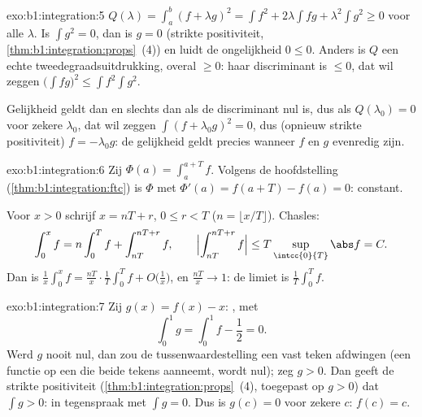 \begin{solution}{exo:b1:integration:5}
$Q(\lambda) = \int_a^b (f + \lambda g)^2 = \int f^2 + 2\lambda \int
fg + \lambda^2 \int g^2 \geq 0$ voor alle $\lambda$. Is $\int g^2 =
0$, dan is $g = 0$ (strikte positiviteit,
\cref{thm:b1:integration:props}~(4)) en luidt de ongelijkheid $0
\leq 0$. Anders is $Q$ een echte tweedegraadsuitdrukking, overal
$\geq 0$: haar discriminant is $\leq 0$, dat wil zeggen $\bigl(\int
fg\bigr)^2 \leq \int f^2 \int g^2$.

Gelijkheid geldt dan en slechts dan als de discriminant nul is, dus
als $Q(\lambda_0) = 0$ voor zekere $\lambda_0$, dat wil zeggen
$\int (f + \lambda_0 g)^2 = 0$, dus (opnieuw strikte positiviteit)
$f = -\lambda_0 g$: de gelijkheid geldt precies wanneer $f$ en $g$
evenredig zijn.
\end{solution}

\begin{solution}{exo:b1:integration:6}
Zij $\Phi(a) = \int_a^{a+T} f$. Volgens de hoofdstelling
(\cref{thm:b1:integration:ftc}) is $\Phi$  met $\Phi'(a) =
f(a + T) - f(a) = 0$: constant.

Voor $x > 0$ schrijf $x = nT + r$, $0 \leq r < T$ ($n = \lfloor x/T
\rfloor$). Chasles:
\[
\int_0^x f = n \int_0^T f + \int_{nT}^{nT + r} f,
\qquad
\Bigl| \int_{nT}^{nT+r} f \Bigr| \leq T \sup_{\intcc{0}{T}} \abs f
= C .
\]
Dan is $\frac 1x \int_0^x f = \frac{nT}{x}\cdot\frac 1T \int_0^T f +
O\bigl(\frac 1x\bigr)$, en $\frac{nT}{x} \to 1$: de limiet is
$\frac1T \int_0^T f$.
\end{solution}

\begin{solution}{exo:b1:integration:7}
Zij $g(x) = f(x) - x$: , met
\[
\int_0^1 g = \int_0^1 f - \frac12 = 0 .
\]
Werd $g$ nooit nul, dan zou de tussenwaardestelling een vast teken
afdwingen (een  functie op een  die beide tekens
aanneemt, wordt nul); zeg $g > 0$. Dan geeft de strikte positiviteit
(\cref{thm:b1:integration:props}~(4), toegepast op $g > 0$) dat
$\int g > 0$: in tegenspraak met $\int g = 0$. Dus is $g(c) = 0$
voor zekere $c$: $f(c) = c$.
\end{solution}

